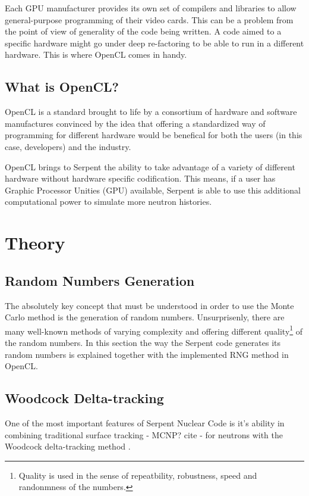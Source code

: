 \documentclass[twoside,a4paper,12pt,english,draft]{anstrans}
\begin{document}
Each GPU manufacturer provides its own set of compilers and libraries to allow general-purpose
programming of their video cards. This can be a problem from the point of view of generality of
the code being written. A code aimed to a specific hardware might go under deep re-factoring to
be able to run in a different hardware. This is where OpenCL comes in handy.

\subsection{What is OpenCL?}

OpenCL\cite{Stone2010} is a standard brought to life by a consortium of hardware and software
manufactures convinced by the idea that offering a standardized way of programming for different
hardware would be benefical for both the users (in this case, developers) and the industry.

OpenCL brings to Serpent the ability to take advantage of a variety of different hardware
without hardware specific codification. This means, if a user has Graphic Processor Unities (GPU)
available, Serpent is able to use this additional computational power to simulate
more neutron histories.

\section{Theory}

\subsection{Random Numbers Generation}
The absolutely key concept that must be understood in order to use the Monte Carlo method is
the generation of random numbers. Unsurprisenly, there are many well-known methods of varying
complexity and offering different quality\footnote{Quality is used in the sense of
  repeatbility, robustness, speed and randonmness of the numbers.} of the random numbers.
In this section the way the Serpent code generates its random numbers is explained together
with the implemented RNG method in OpenCL.


\subsection{Woodcock Delta-tracking}

One of the most important features of Serpent Nuclear Code is it's ability in combining
traditional surface tracking - MCNP? cite - for neutrons with the Woodcock delta-tracking method \cite{Woodcock1965}.
\end{document}
